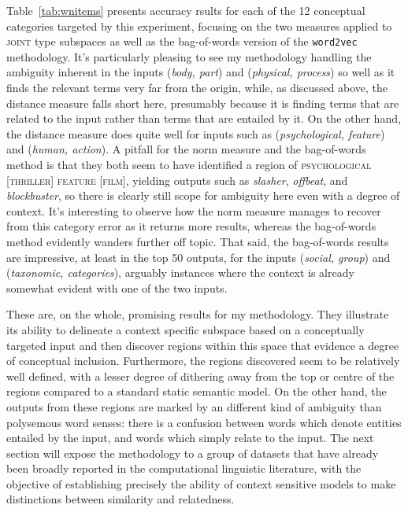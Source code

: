 Table~\ref{tab:wnitems} presents accuracy rsults for each of the 12 conceptual categories targeted by this experiment, focusing on the two measures applied to \textsc{joint} type subspaces as well as the bag-of-words version of the \texttt{word2vec} methodology.  It's particularly pleasing to see my methodology handling the ambiguity inherent in the inputs (\emph{body, part}) and (\emph{physical, process}) so well as it finds the relevant terms very far from the origin, while, as discussed above, the distance measure falls short here, presumably because it is finding terms that are related to the input rather than terms that are entailed by it.  On the other hand, the distance measure does quite well for inputs such as (\emph{psychological, feature}) and (\emph{human, action}).  A pitfall for the norm measure and the bag-of-words method is that they both seem to have identified a region of \textsc{psychological [thriller] feature [film]}, yielding outputs such as \emph{slasher}, \emph{offbeat}, and \emph{blockbuster}, so there is clearly still scope for ambiguity here even with a degree of context.  It's interesting to observe how the norm measure manages to recover from this category error as it returns more results, whereas the bag-of-words method evidently wanders further off topic.  That said, the bag-of-words results are impressive, at least in the top 50 outputs, for the inputs (\emph{social, group}) and (\emph{taxonomic, categories}), arguably instances where the context is already somewhat evident with one of the two inputs.

These are, on the whole, promising results for my methodology.  They illustrate its ability to delineate a context specific subspace based on a conceptually targeted input and then discover regions within this space that evidence a degree of conceptual inclusion.  Furthermore, the regions discovered seem to be relatively well defined, with a lesser degree of dithering away from the top or centre of the regions compared to a standard static semantic model.  On the other hand, the outputs from these regions are marked by an different kind of ambiguity than polysemous word senses: there is a confusion between words which denote entities entailed by the input, and words which simply relate to the input.  The next section will expose the methodology to a group of datasets that have already been broadly reported in the computational linguistic literature, with the objective of establishing precisely the ability of context sensitive models to make distinctions between similarity and relatedness.

